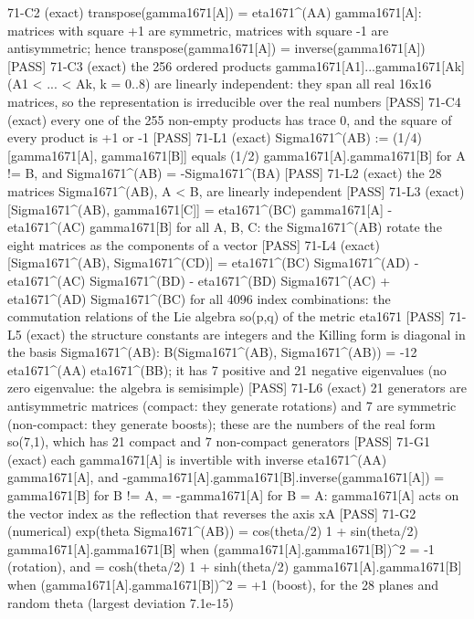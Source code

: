 \documentclass[
  10pt,
]{article}
\newenvironment{Shaded}{}{}
\newcommand{\NormalTok}[1]{#1}
\begin{document}
\begin{Shaded}
\begin{Highlighting}[]
\NormalTok{[PASS] 71{-}C2  (exact) transpose(gamma1671[A]) = eta1671\^{}(AA) gamma1671[A]: matrices with square +1 are symmetric, matrices with square {-}1 are antisymmetric; hence transpose(gamma1671[A]) = inverse(gamma1671[A])}
\NormalTok{[PASS] 71{-}C3  (exact) the 256 ordered products gamma1671[A1]...gamma1671[Ak] (A1 \textless{} ... \textless{} Ak, k = 0..8) are linearly independent: they span all real 16x16 matrices, so the representation is irreducible over the real numbers}
\NormalTok{[PASS] 71{-}C4  (exact) every one of the 255 non{-}empty products has trace 0, and the square of every product is +1 or {-}1}
\NormalTok{[PASS] 71{-}L1  (exact) Sigma1671\^{}(AB) := (1/4)[gamma1671[A], gamma1671[B]] equals (1/2) gamma1671[A].gamma1671[B] for A != B, and Sigma1671\^{}(AB) = {-}Sigma1671\^{}(BA)}
\NormalTok{[PASS] 71{-}L2  (exact) the 28 matrices Sigma1671\^{}(AB), A \textless{} B, are linearly independent}
\NormalTok{[PASS] 71{-}L3  (exact) [Sigma1671\^{}(AB), gamma1671[C]] = eta1671\^{}(BC) gamma1671[A] {-} eta1671\^{}(AC) gamma1671[B] for all A, B, C: the Sigma1671\^{}(AB) rotate the eight matrices as the components of a vector}
\NormalTok{[PASS] 71{-}L4  (exact) [Sigma1671\^{}(AB), Sigma1671\^{}(CD)] = eta1671\^{}(BC) Sigma1671\^{}(AD) {-} eta1671\^{}(AC) Sigma1671\^{}(BD) {-} eta1671\^{}(BD) Sigma1671\^{}(AC) + eta1671\^{}(AD) Sigma1671\^{}(BC) for all 4096 index combinations: the commutation relations of the Lie algebra so(p,q) of the metric eta1671}
\NormalTok{[PASS] 71{-}L5  (exact) the structure constants are integers and the Killing form is diagonal in the basis Sigma1671\^{}(AB): B(Sigma1671\^{}(AB), Sigma1671\^{}(AB)) = {-}12 eta1671\^{}(AA) eta1671\^{}(BB); it has 7 positive and 21 negative eigenvalues (no zero eigenvalue: the algebra is semisimple)}
\NormalTok{[PASS] 71{-}L6  (exact) 21 generators are antisymmetric matrices (compact: they generate rotations) and 7 are symmetric (non{-}compact: they generate boosts); these are the numbers of the real form so(7,1), which has 21 compact and 7 non{-}compact generators}
\NormalTok{[PASS] 71{-}G1  (exact) each gamma1671[A] is invertible with inverse eta1671\^{}(AA) gamma1671[A], and {-}gamma1671[A].gamma1671[B].inverse(gamma1671[A]) = gamma1671[B] for B != A, = {-}gamma1671[A] for B = A: gamma1671[A] acts on the vector index as the reflection that reverses the axis xA}
\NormalTok{[PASS] 71{-}G2  (numerical) exp(theta Sigma1671\^{}(AB)) = cos(theta/2) 1 + sin(theta/2) gamma1671[A].gamma1671[B] when (gamma1671[A].gamma1671[B])\^{}2 = {-}1 (rotation), and = cosh(theta/2) 1 + sinh(theta/2) gamma1671[A].gamma1671[B] when (gamma1671[A].gamma1671[B])\^{}2 = +1 (boost), for the 28 planes and random theta (largest deviation 7.1e{-}15)}

\end{Highlighting}
\end{Shaded}
\end{document}
